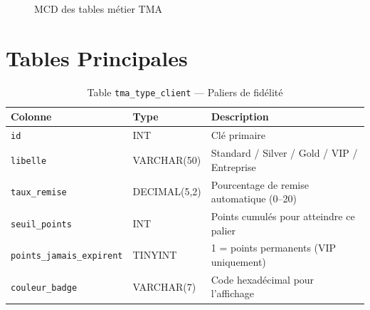 \documentclass[12pt,a4paper]{report}
\begin{document}
\begin{figure}[H]
\caption{MCD des tables m\'etier TMA}
\end{figure}

\section{Tables Principales}

\begin{table}[H]
\centering
\caption{Table \texttt{tma\_type\_client} --- Paliers de fid\'elit\'e}
\begin{tabularx}{\linewidth}{llX}
  \toprule
  \textbf{Colonne} & \textbf{Type} & \textbf{Description} \\
  \midrule
  \texttt{id}                     & INT        & Cl\'e primaire \\
  \texttt{libelle}                & VARCHAR(50) & Standard / Silver / Gold / VIP / Entreprise \\
  \texttt{taux\_remise}           & DECIMAL(5,2) & Pourcentage de remise automatique (0--20) \\
  \texttt{seuil\_points}          & INT         & Points cumul\'es pour atteindre ce palier \\
  \texttt{points\_jamais\_expirent} & TINYINT   & 1 = points permanents (VIP uniquement) \\
  \texttt{couleur\_badge}         & VARCHAR(7)  & Code hexad\'ecimal pour l'affichage \\
  \bottomrule
\end{tabularx}
\end{table}
\end{document}
